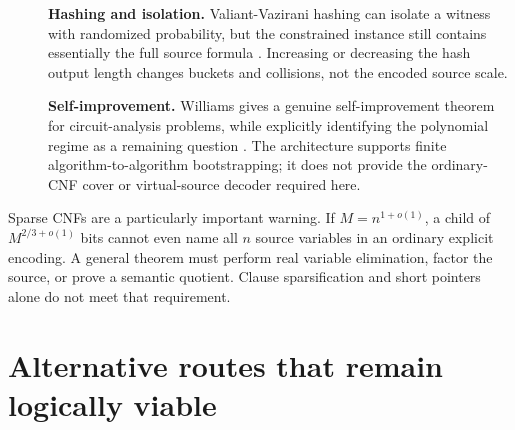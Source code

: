 \documentclass[11pt]{article}
\begin{document}
\begin{description}
\item[] \textbf{Hashing and isolation.}
Valiant-Vazirani hashing can isolate a witness with randomized probability,
but the constrained instance still contains essentially the full source
formula \cite{valiantvazirani1986}.  Increasing or decreasing the hash output
length changes buckets and collisions, not the encoded source scale.

\item[] \textbf{Self-improvement.}
Williams gives a genuine self-improvement theorem for circuit-analysis
problems, while explicitly identifying the polynomial regime as a remaining
question \cite{williams2024}.  The architecture supports finite
algorithm-to-algorithm bootstrapping; it does not provide the ordinary-CNF
cover or virtual-source decoder required here.
\end{description}

Sparse CNFs are a particularly important warning.  If $M=n^{1+o(1)}$, a
child of $M^{2/3+o(1)}$ bits cannot even name all $n$ source variables in an
ordinary explicit encoding.  A general theorem must perform real variable
elimination, factor the source, or prove a semantic quotient.  Clause
sparsification and short pointers alone do not meet that requirement.

\section{Alternative routes that remain logically viable}
\end{document}
